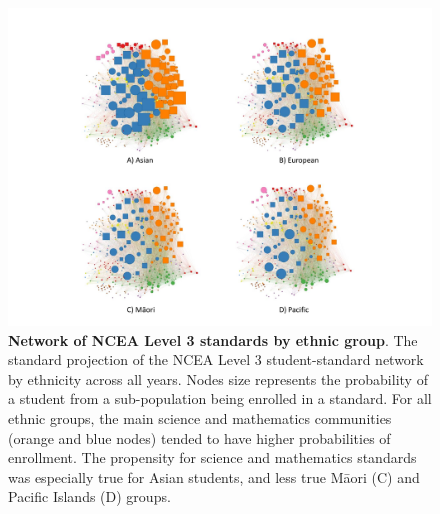 \begin{figure}
    \centering
    \includegraphics[width = \textwidth]{C2 - Student Pathways/NCEA_Level3_network_ethnicity.pdf}
    \caption{\textbf{Network of NCEA Level 3 standards by ethnic group}. The standard projection of the NCEA Level 3 student-standard network by ethnicity across all years. Nodes size represents the probability of a student from a sub-population being enrolled in a standard. For all ethnic groups, the main science and mathematics communities (orange and blue nodes) tended to have higher probabilities of enrollment. The propensity for science and mathematics standards was especially true for Asian students, and less true M\={a}ori (C) and Pacific Islands (D) groups.
    }
    
    \label{fig:NetworkEthnicity}
\end{figure}

